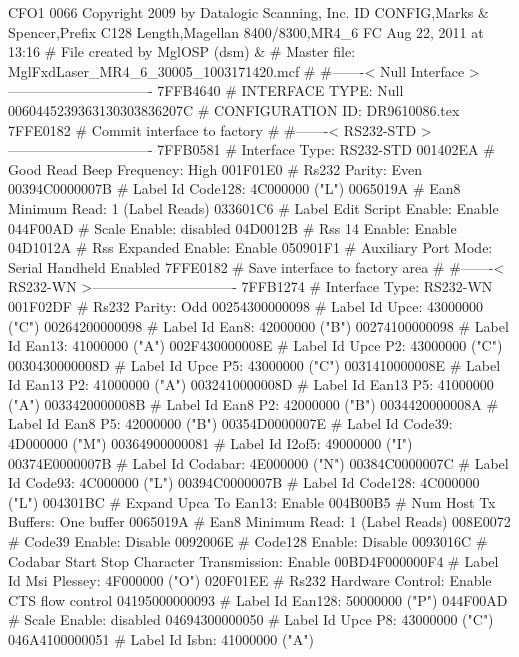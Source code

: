 CFO1 0066
Copyright 2009 by Datalogic Scanning, Inc.
ID CONFIG,Marks & Spencer,Prefix C128 Length,Magellan 8400/8300,MR4_6
FC Aug 22, 2011 at 13:16
# File created by MglOSP (dsm)
&
# Master file: MglFxdLaser_MR4_6_30005_1003171420.mcf
#
#-------< Null Interface >-------------------------------
7FFB4640            # INTERFACE TYPE: Null
0060445239363130303836207C # CONFIGURATION ID: DR9610086.tex
7FFE0182            # Commit interface to factory
#
#-------< RS232-STD >-------------------------------
7FFB0581            # Interface Type: RS232-STD
001402EA            # Good Read Beep Frequency: High
001F01E0            # Rs232 Parity: Even
00394C0000007B      # Label Id Code128: 4C000000 ("L")
0065019A            # Ean8 Minimum Read: 1 (Label Reads)
033601C6            # Label Edit Script Enable: Enable
044F00AD            # Scale Enable: disabled
04D0012B            # Rss 14 Enable: Enable
04D1012A            # Rss Expanded Enable: Enable
050901F1            # Auxiliary Port Mode: Serial Handheld Enabled
7FFE0182            # Save interface to factory area
#
#-------< RS232-WN >-------------------------------
7FFB1274            # Interface Type: RS232-WN
001F02DF            # Rs232 Parity: Odd
00254300000098      # Label Id Upce: 43000000 ("C")
00264200000098      # Label Id Ean8: 42000000 ("B")
00274100000098      # Label Id Ean13: 41000000 ("A")
002F430000008E      # Label Id Upce P2: 43000000 ("C")
0030430000008D      # Label Id Upce P5: 43000000 ("C")
0031410000008E      # Label Id Ean13 P2: 41000000 ("A")
0032410000008D      # Label Id Ean13 P5: 41000000 ("A")
0033420000008B      # Label Id Ean8 P2: 42000000 ("B")
0034420000008A      # Label Id Ean8 P5: 42000000 ("B")
00354D0000007E      # Label Id Code39: 4D000000 ("M")
00364900000081      # Label Id I2of5: 49000000 ("I")
00374E0000007B      # Label Id Codabar: 4E000000 ("N")
00384C0000007C      # Label Id Code93: 4C000000 ("L")
00394C0000007B      # Label Id Code128: 4C000000 ("L")
004301BC            # Expand Upca To Ean13: Enable
004B00B5            # Num Host Tx Buffers: One buffer
0065019A            # Ean8 Minimum Read: 1 (Label Reads)
008E0072            # Code39 Enable: Disable
0092006E            # Code128 Enable: Disable
0093016C            # Codabar Start Stop Character Transmission: Enable
00BD4F000000F4      # Label Id Msi Plessey: 4F000000 ("O")
020F01EE            # Rs232 Hardware Control: Enable CTS flow control
04195000000093      # Label Id Ean128: 50000000 ("P")
044F00AD            # Scale Enable: disabled
04694300000050      # Label Id Upce P8: 43000000 ("C")
046A4100000051      # Label Id Isbn: 41000000 ("A")
